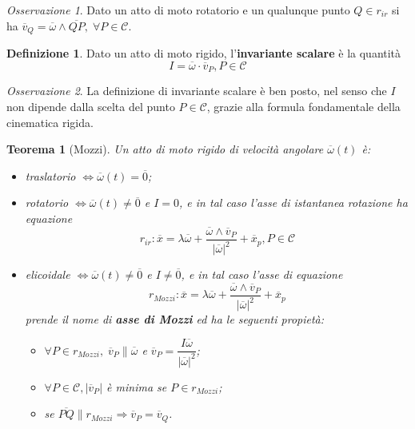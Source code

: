 \documentclass{book}
\theoremstyle{plain}
\newtheorem{teo}{Teorema}[chapter]
\theoremstyle{plain}
\theoremstyle{plain}
\theoremstyle{plain}
\theoremstyle{plain}
\theoremstyle{definition}
\newtheorem{defi}{Definizione}[chapter]
\theoremstyle{remark}
\newtheorem*{oss}{Osservazione}
\theoremstyle{definition}
\begin{document}
\begin{oss}
    Dato un atto di moto rotatorio e un qualunque punto $Q \in r_{ir}$ si ha $\overline{v}_Q = \overline{\omega} \wedge \overline{QP}, \; \forall P \in \mathcal{C}$.
\end{oss}

\begin{defi}
    Dato un atto di moto rigido, l'\textbf{invariante scalare} è la quantità
    \begin{displaymath}
        \boxed{
        I=\overline{\omega} \cdot \overline{v}_{P}, P\in \mathcal{C}
        }
    \end{displaymath}
\end{defi}

\begin{oss}
    La definizione di invariante scalare è ben posto, nel senso che $I$ non dipende dalla scelta del punto $P \in \mathcal{C}$, grazie alla formula fondamentale della cinematica rigida.
\end{oss}

\begin{teo}[Mozzi]
    Un atto di moto rigido di velocità angolare $\overline{\omega}(t)$ è:
    \begin{itemize}
        \item traslatorio $\iff \overline{\omega}(t)=\overline{0}$;
        \item rotatorio $\iff \overline{\omega}(t) \neq \overline{0}$ e $I=0$, e in tal caso l'asse di istantanea rotazione ha equazione
        \begin{displaymath}
            r_{ir}: \overline{x}=\lambda \overline{\omega}+\frac{\overline{\omega} \wedge \overline{v}_P}{|\overline{\omega}|^{2}}+\overline{x}_{p}, P \in \mathcal{C}
        \end{displaymath}
        \item elicoidale $\iff \overline{\omega}(t) \neq \overline{0}$ e $I \neq \overline{0}$, e in tal caso l'asse di equazione
        \begin{displaymath}
            r_{Mozzi}: \overline{x}=\lambda \overline{\omega}+\frac{\overline{\omega} \wedge \overline{v}_{P}}{|\overline{\omega}|^{2}}+\overline{x}_{p}
        \end{displaymath}
        prende il nome di \textbf{asse di Mozzi} ed ha le seguenti propietà:
        \begin{itemize}
            \item $\forall P \in r_{Mozzi}, \; \overline{v}_P \parallel \overline{\omega}$ e $\overline{v}_P = \dfrac{I\overline{\omega}}{|\overline{\omega}|^2}$;
            \item $\forall P \in \mathcal{C}, |\overline{v}_P|$ è minima se $P \in r_{Mozzi}$;
            \item se $\overline{PQ} \parallel r_{Mozzi} \Longrightarrow \overline{v}_P = \overline{v}_Q$.
        \end{itemize}
    \end{itemize}
\end{teo}
\end{document}
